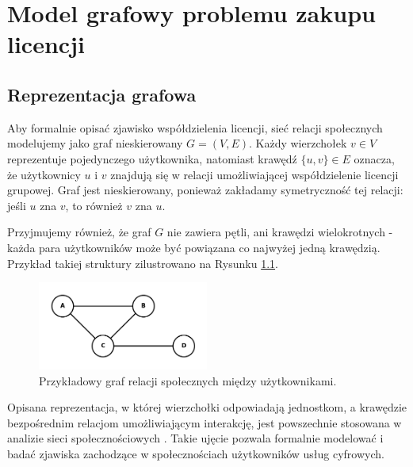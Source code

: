 \chapter{Model grafowy problemu zakupu licencji}

\section{Reprezentacja grafowa}

Aby formalnie opisać zjawisko współdzielenia licencji, sieć relacji społecznych modelujemy jako graf nieskierowany \( G = (V, E) \). Każdy wierzchołek \( v \in V \) reprezentuje pojedynczego użytkownika, natomiast krawędź \( \{u, v\} \in E \) oznacza, że użytkownicy \( u \) i \( v \) znajdują się w relacji umożliwiającej współdzielenie licencji grupowej. Graf jest nieskierowany, ponieważ zakładamy symetryczność tej relacji: jeśli \( u \) zna \( v \), to również \( v \) zna \( u \).

Przyjmujemy również, że graf \( G \) nie zawiera pętli, ani krawędzi wielokrotnych - każda para użytkowników może być powiązana co najwyżej jedną krawędzią. Przykład takiej struktury zilustrowano na Rysunku \ref{fig:social_graph}.

\begin{figure}[H]
  \centering
  \includegraphics[width=0.5\textwidth]{assets/graphmodelexample.png}
  \caption{Przykładowy graf relacji społecznych między użytkownikami.}
  \label{fig:social_graph}
\end{figure}

Opisana reprezentacja, w której wierzchołki odpowiadają jednostkom, a krawędzie bezpośrednim relacjom umożliwiającym interakcję, jest powszechnie stosowana w analizie sieci społecznościowych \cite{Brandes2004, NETTLETON20131}. Takie ujęcie pozwala formalnie modelować i badać zjawiska zachodzące w społecznościach użytkowników usług cyfrowych.

